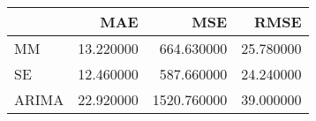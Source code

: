 \begin{tabular}{lrrr}
\toprule
 & MAE & MSE & RMSE \\
\midrule
MM & 13.220000 & 664.630000 & 25.780000 \\
SE & 12.460000 & 587.660000 & 24.240000 \\
ARIMA & 22.920000 & 1520.760000 & 39.000000 \\
\bottomrule
\end{tabular}

